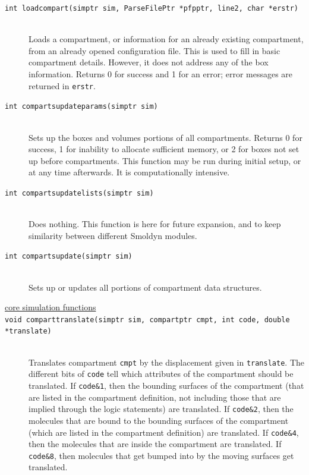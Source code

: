 \documentclass {scrbook}
\newcommand {\ttt} {\texttt}
\begin{document}
\begin{description}
\item[\ttt{int loadcompart(simptr sim, ParseFilePtr *pfpptr, line2, char *erstr)}]
\hfill \\
Loads a compartment, or information for an already existing compartment, from an already opened configuration file. This is used to fill in basic compartment details. However, it does not address any of the box information. Returns 0 for success and 1 for an error; error messages are returned in \ttt{erstr}.

\item[\ttt{int compartsupdateparams(simptr sim)}]
\hfill \\
Sets up the boxes and volumes portions of all compartments. Returns 0 for success, 1 for inability to allocate sufficient memory, or 2 for boxes not set up before compartments. This function may be run during initial setup, or at any time afterwards. It is computationally intensive.

\item[\ttt{int compartsupdatelists(simptr sim)}]
\hfill \\
Does nothing. This function is here for future expansion, and to keep similarity between different Smoldyn modules.

\item[\ttt{int compartsupdate(simptr sim)}]
\hfill \\
Sets up or updates all portions of compartment data structures.

\item[\underline{core simulation functions}]

\item[\ttt{void comparttranslate(simptr sim, compartptr cmpt, int code, double *translate)}]
\hfill \\
Translates compartment \ttt{cmpt} by the displacement given in \ttt{translate}. The different bits of \ttt{code} tell which attributes of the compartment should be translated. If \ttt{code\&1}, then the bounding surfaces of the compartment (that are listed in the compartment definition, not including those that are implied through the logic statements) are translated. If \ttt{code\&2}, then the molecules that are bound to the bounding surfaces of the compartment (which are listed in the compartment definition) are translated. If \ttt{code\&4}, then the molecules that are inside the compartment are translated. If \ttt{code\&8}, then molecules that get bumped into by the moving surfaces get translated.


\end{description}
\end{document}
